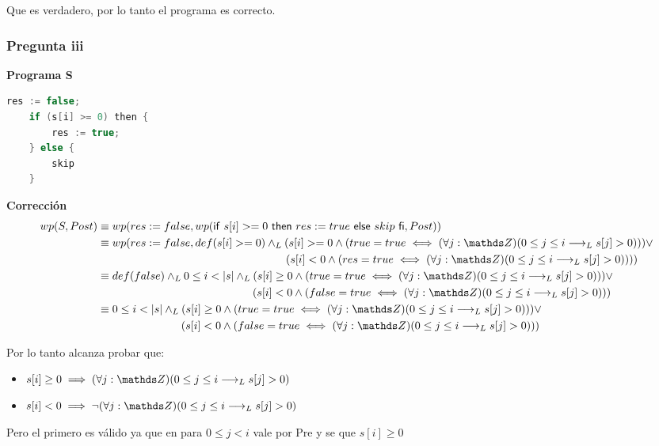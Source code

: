Que es verdadero, por lo tanto el programa es correcto.

\subsubsection{Pregunta iii}

\textbf{Programa S}

\begin{lstlisting}[language = C++]
    res := false;
    if (s[i] >= 0) then {
        res := true;
    } else {
        skip
    } 
\end{lstlisting}

\textbf{Corrección}
\begin{align*}
    wp(S, Post) &\equiv wp(res := false, wp(\IfThenElse{s[i] >= 0}{res := true}{skip}, Post)) \\
    &\equiv wp(res := false, def(s[i] >= 0) \yLuego (s[i] >= 0 \wedge (true = true \iff (\forall j: \ent)(0\leq j \leq i \implicaLuego s[j] > 0))) \vee \\
    &\qquad \qquad \qquad \qquad \qquad \qquad \qquad \qquad \quad(s[i] < 0 \wedge (res = true \iff (\forall j: \ent)(0\leq j \leq i \implicaLuego s[j] > 0)))) \\
    &\equiv def(false) \yLuego 0 \leq i < |s| \yLuego (s[i] \geq 0 \wedge (true = true \iff (\forall j: \ent)(0\leq j \leq i \implicaLuego s[j] > 0))) \vee \\
    &\qquad \qquad \qquad \qquad \qquad \qquad \qquad (s[i] < 0 \wedge (false = true \iff (\forall j: \ent)(0\leq j \leq i \implicaLuego s[j] > 0))) \\
    &\equiv 0 \leq i < |s| \yLuego (s[i] \geq 0 \wedge (true = true \iff (\forall j: \ent)(0\leq j \leq i \implicaLuego s[j] > 0))) \vee \\
    &\qquad \qquad \qquad \quad \; \;(s[i] < 0 \wedge (false = true \iff (\forall j: \ent)(0\leq j \leq i \implicaLuego s[j] > 0))) \\
\end{align*}

Por lo tanto alcanza probar que:
\begin{itemize}
    \item $ s[i] \geq 0 \implies (\forall j: \ent)(0\leq j \leq i \implicaLuego s[j] > 0) $
    \item $ s[i] < 0 \implies \neg(\forall j: \ent)(0\leq j \leq i \implicaLuego s[j] > 0) $
\end{itemize}

Pero el primero es válido ya que en para $ 0 \leq j < i $ vale por Pre y se que $ s[i] \geq 0 $


